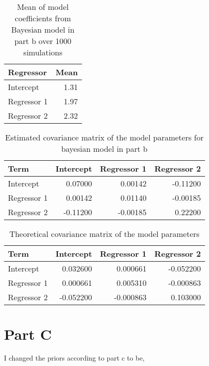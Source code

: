 \documentclass[]{book}
\begin{document}
\begin{table}

\caption{\label{tab:bayes-b-mean-coefs-q3}Mean of model coefficients from Bayesian model in part b over 1000 simulations}
\centering
\begin{tabular}[t]{lr}
\toprule
Regressor & Mean\\
\midrule
Intercept & 1.31\\
Regressor 1 & 1.97\\
Regressor 2 & 2.32\\
\bottomrule
\end{tabular}
\end{table}

\begin{table}

\caption{\label{tab:bayes-b-est-vcov-q3}Estimated covariance matrix of the model parameters for bayesian model in part b}
\centering
\begin{tabular}[t]{lrrr}
\toprule
Term & Intercept & Regressor 1 & Regressor 2\\
\midrule
Intercept & 0.07000 & 0.00142 & -0.11200\\
Regressor 1 & 0.00142 & 0.01140 & -0.00185\\
Regressor 2 & -0.11200 & -0.00185 & 0.22200\\
\bottomrule
\end{tabular}
\end{table}

\begin{table}

\caption{\label{tab:theory-vcov-b-q3}Theoretical covariance matrix of the model parameters}
\centering
\begin{tabular}[t]{lrrr}
\toprule
Term & Intercept & Regressor 1 & Regressor 2\\
\midrule
Intercept & 0.032600 & 0.000661 & -0.052200\\
Regressor 1 & 0.000661 & 0.005310 & -0.000863\\
Regressor 2 & -0.052200 & -0.000863 & 0.103000\\
\bottomrule
\end{tabular}
\end{table}

\hypertarget{part-c-2}{%
\section{Part C}\label{part-c-2}}

I changed the priors according to part c to be,
\end{document}
